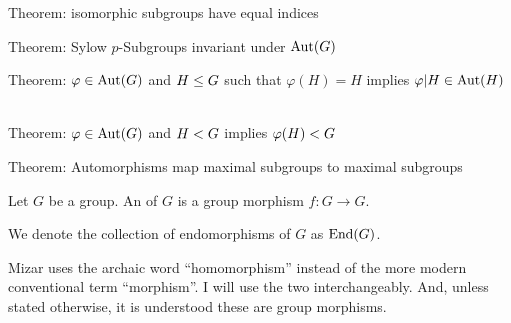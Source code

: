 \LA{}Theorem: isomorphic subgroups have equal indices~{\nwtagstyle{}}\RA{}

\LA{}Theorem: Sylow $p$-Subgroups invariant under $\operatorname{Aut}(G)$~{\nwtagstyle{}}\RA{}

\LA{}Theorem: $\varphi\in\operatorname{Aut}(G)$ and $H\leq G$ such that $\varphi(H)=H$ implies $\varphi|H\in\operatorname{Aut}(H)$~{\nwtagstyle{}}\RA{}

\LA{}Theorem: $\varphi\in\operatorname{Aut}(G)$ and $H< G$ implies $\varphi(H)< G$~{\nwtagstyle{}}\RA{}

\LA{}Theorem: Automorphisms map maximal subgroups to maximal subgroups~{\nwtagstyle{}}\RA{}
\nwendcode{}\nwdocspar

\begin{definition*}
Let $G$ be a group. An  of $G$ is a group morphism
$f\colon G\to G$.
\end{definition*}

\begin{remark}
We denote the collection of endomorphisms of $G$ as $\operatorname{End}(G)$.
\end{remark}

\begin{remark}
Mizar uses the archaic word ``homomorphism'' instead of the more modern
conventional term ``morphism''. I will use the two interchangeably. And,
unless stated otherwise, it is understood these are group morphisms.
\end{remark}

